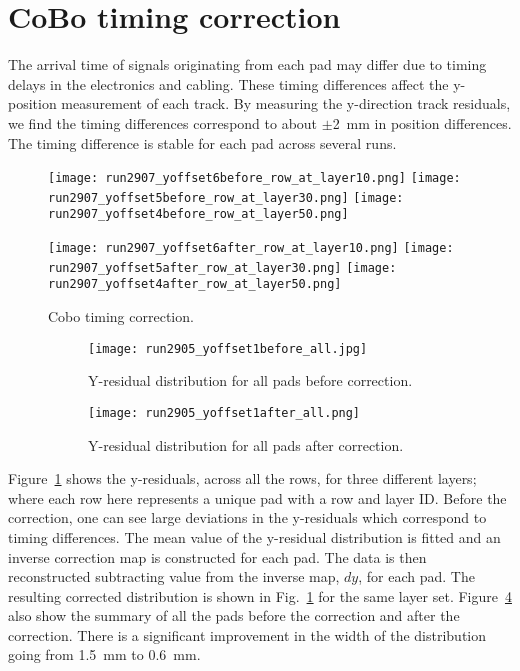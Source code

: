 \section{CoBo timing correction}
The arrival time of signals originating from each pad may differ due to timing delays in the electronics and cabling. These timing differences affect the y-position measurement of each track. By measuring the y-direction track residuals, we find the timing differences correspond to about $\pm$\SI{2}{\milli\metre} in position differences. The timing difference is stable for each pad across several runs. 

\begin{figure}[!htb]
  \begin{center}
    \texttt{[image: run2907\_yoffset6before\_row\_at\_layer10.png]}
    \texttt{[image: run2907\_yoffset5before\_row\_at\_layer30.png]}
    \texttt{[image: run2907\_yoffset4before\_row\_at\_layer50.png]}
 
    \texttt{[image: run2907\_yoffset6after\_row\_at\_layer10.png]}
    \texttt{[image: run2907\_yoffset5after\_row\_at\_layer30.png]}
    \texttt{[image: run2907\_yoffset4after\_row\_at\_layer50.png]}
 
  \end{center}
  \caption{Cobo timing correction.}
  \label{fig:coboCorr}
\end{figure}



\begin{figure}[!htb]
    \begin{subfigure}[t]{.49\textwidth}
        \centering
        \texttt{[image: run2905\_yoffset1before\_all.jpg]} 
        \caption{Y-residual distribution for all pads before correction.} \label{fig:yoff_allBefore}
    \end{subfigure}
    \hfill
    \begin{subfigure}[t]{.49\textwidth}
        \centering
        \texttt{[image: run2905\_yoffset1after\_all.png]}
        \caption{Y-residual distribution for all pads after correction.} \label{fig:yoff_allAfter}
    \end{subfigure}
    \caption{ }
\label{fig:yoff}
\end{figure}


 Figure~\ref{fig:coboCorr} shows the y-residuals, across all the rows, for three different layers; where each row here represents a unique pad with a row and layer ID. Before the correction, one can see large deviations in the y-residuals which correspond to timing differences. The mean value of the y-residual distribution is fitted and an inverse correction map is constructed for each pad. The data is then reconstructed subtracting value from the inverse map, $dy$, for each pad. The resulting corrected distribution is shown in Fig.~\ref{fig:coboCorr} for the same layer set. Figure~\ref{fig:yoff} also show the summary of all the pads before the correction and after the correction. There is a significant improvement in the width of the distribution going from \SI{1.5}{\milli\metre} to \SI{0.6}{\milli\metre}. 



